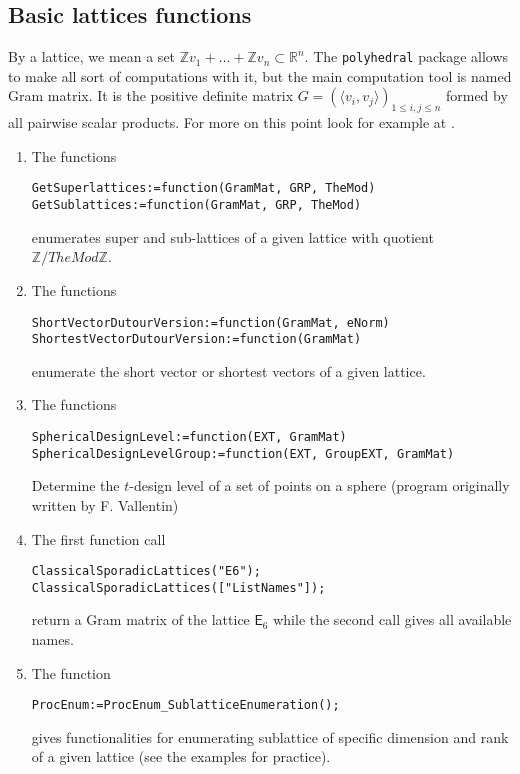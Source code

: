 \documentclass[12pt]{amsart}
\newcommand{\RR}{\ensuremath{\mathbb{R}}}
\newcommand{\ZZ}{\ensuremath{\mathbb{Z}}}
\begin{document}
\subsection{Basic lattices functions}

By a lattice, we mean a set $\ZZ v_1 + \dots + \ZZ v_n \subset \RR^n$.
The {\tt polyhedral} package allows to make all sort of computations
with it, but the main computation tool is named Gram matrix. It is
the positive definite matrix $G=(\langle v_i, v_j\rangle)_{1\leq i,j\leq n}$
formed by all pairwise scalar products.
For more on this point look for example at \cite{perfectdim8,CS,martinet}.

\begin{enumerate}
\item The functions
\begin{verbatim}
GetSuperlattices:=function(GramMat, GRP, TheMod)
GetSublattices:=function(GramMat, GRP, TheMod)
\end{verbatim}
enumerates super and sub-lattices of a given lattice
with quotient $\ZZ/TheMod \ZZ$.

\item The functions
\begin{verbatim}
ShortVectorDutourVersion:=function(GramMat, eNorm)
ShortestVectorDutourVersion:=function(GramMat)
\end{verbatim}
enumerate the short vector or shortest vectors of a given lattice.

\item The functions
\begin{verbatim}
SphericalDesignLevel:=function(EXT, GramMat)
SphericalDesignLevelGroup:=function(EXT, GroupEXT, GramMat)
\end{verbatim}
Determine the $t$-design level of a set of points on a sphere
(program originally written by F. Vallentin)

\item The first function call 
\begin{verbatim}
ClassicalSporadicLattices("E6");
ClassicalSporadicLattices(["ListNames"]);
\end{verbatim}
return a Gram matrix of the lattice $\mathsf{E}_6$ while the second
call gives all available names.

\item The function
\begin{verbatim}
ProcEnum:=ProcEnum_SublatticeEnumeration();
\end{verbatim}
gives functionalities for enumerating sublattice of specific dimension and rank
of a given lattice (see the examples for practice).


\end{enumerate}
\end{document}
